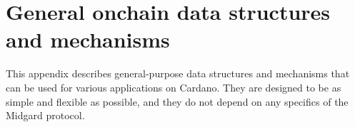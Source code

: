 \documentclass[../midgard.tex]{subfiles}
\begin{document}
\chapter{General onchain data structures and mechanisms}
\label{h:general-onchain-data-structures-and-mechanisms}

This appendix describes general-purpose data structures and mechanisms that can be used for various applications on Cardano. They are designed to be as simple and flexible as possible, and they do not depend on any specifics of the Midgard protocol.
\end{document}
